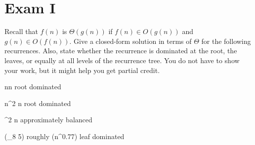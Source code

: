 \chapter{Exam I}
\label{ch:exam1}

\begin{gram}
Recall that $f(n)$ is $\Theta(g(n))$
if $f(n) \in O(g(n))$ and $g(n) \in O(f(n))$.
Give a closed-form
solution in terms of $\Theta$ for the following recurrences.
Also, state whether the recurrence is dominated at the root, the
leaves, or equally at all levels of the recurrence tree.
You do not have to show your work, but it might help you get partial
credit.
\end{gram}


        {n\lg n}
        {root dominated}  %

        {n^2 n}
        {root dominated}  %

        {\lg^2 n}
        {approximately balanced}

        {\Theta(\lg_8 5) roughly \Theta(n^{0.77})}
        {leaf dominated}



